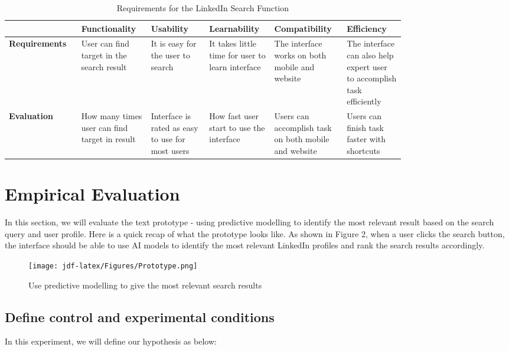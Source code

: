 \documentclass[
	letterpaper, %
]{jdf}
\begin{document}
\begin{table}[h] %
	\caption{Requirements for the LinkedIn Search Function}
	\small %
	\centering %
	\begin{tabular}{L{0.13\linewidth} L{0.13\linewidth} L{0.13\linewidth} L{0.13\linewidth} L{0.13\linewidth} L{0.13\linewidth}}
		\textbf{\-} & \textbf{Functionality} & \textbf{Usability} & \textbf{Learnability} & \textbf{Compatibility} & \textbf{Efficiency}\\
		\toprule[0.5pt]
		\textbf{Requirements} & User can find target in the search result & It is easy for the user to search & It takes little time for user to learn interface & The interface works on both mobile and website & The interface can also help expert user to accomplish task efficiently \\
		\midrule
		\textbf{Evaluation} & How many times user can find target in result & Interface is rated as easy to use for most users & How fast user start to use the interface & Users can accomplish task on both mobile and website & Users can finish task faster with shortcuts \\
	\end{tabular}
\end{table}

\section{Empirical Evaluation}
In this section, we will evaluate the text prototype - using predictive modelling to identify the most relevant result based on the search query and user profile. Here is a quick recap of what the prototype looks like. As shown in Figure 2, when a user clicks the search button, the interface should be able to use AI models to identify the most relevant LinkedIn profiles and rank the search results accordingly.
\begin{figure}[h]
	\centering
	\texttt{[image: jdf-latex/Figures/Prototype.png]}
	\caption{Use predictive modelling to give the most relevant search results}
	\label{fig:textprototype}
\end{figure}

\subsection{Define control and experimental conditions}
In this experiment, we will define our hypothesis as below:
\end{document}
